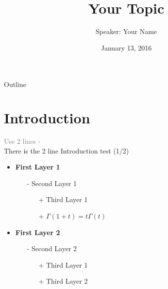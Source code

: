 \documentclass{beamer}
\title {
    Your Topic
}
\author {
    Speaker: Your Name
}
\date {
    January 13, 2016 %
}
\begin{document}
\begin{frame}
    \titlepage
\end{frame}


\begin{frame}{Outline}
    \tableofcontentsgather
    \tableofcontents
\end{frame}

\section{Introduction}

\begin{frame}{\textcolor{gray}{Use 2 lines -} \\ There is the 2 line Introduction test (1/2)}
    \begin{itemize}
        \item \textbf{First Layer 1}
        \begin{itemize}
            \item[-] Second Layer 1
            \begin{itemize}
                \item[+] Third Layer 1
                \item[+] $\Gamma(1+t)=t\Gamma(t)$
            \end{itemize}
        \end{itemize}

        \item \textbf{First Layer 2} \cite{Li15}
        \begin{itemize}
            \item[-] Second Layer 2 \cite{CPY11}
            \begin{itemize}
                \item[+] Third Layer 1 \cite{Meyn07}
                \item[+] Third Layer 2 \cite{Hartl1995}
            \end{itemize}
        \end{itemize}
    \end{itemize}
\end{frame}
\end{document}
